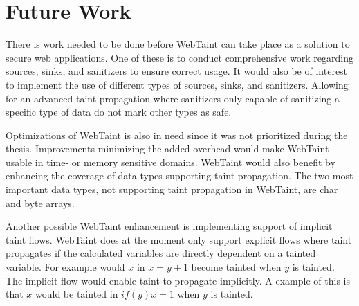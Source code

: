 \chapter{Future Work}
\label{FutureWork}
There is work needed to be done before WebTaint can take place as a solution to secure web applications. One of these is to conduct comprehensive work regarding sources, sinks, and sanitizers to ensure correct usage. It would also be of interest to implement the use of different types of sources, sinks, and sanitizers. Allowing for an advanced taint propagation where sanitizers only capable of sanitizing a specific type of data do not mark other types as safe. 

Optimizations of WebTaint is also in need since it was not prioritized during the thesis. Improvements minimizing the added overhead would make WebTaint usable in time- or memory sensitive domains. WebTaint would also benefit by enhancing the coverage of data types supporting taint propagation. The two most important data types, not supporting taint propagation in WebTaint, are char and byte arrays. 

Another possible WebTaint enhancement is implementing support of implicit taint flows. WebTaint does at the moment only support explicit flows where taint propagates if the calculated variables are directly dependent on a tainted variable. For example would $ x $ in $ x = y + 1 $ become tainted when $ y $ is tainted. The implicit flow would enable taint to propagate implicitly. A example of this is that $ x $ would be tainted in $ if (y) x = 1 $ when $ y $ is tainted.